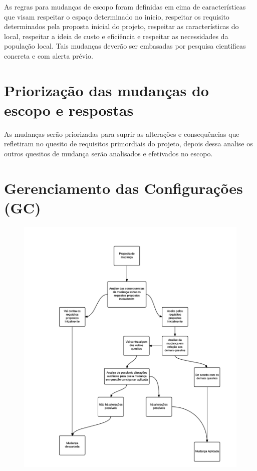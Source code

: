 As regras para mudanças de escopo foram definidas em cima de características que visam respeitar o espaço determinado no inicio, respeitar os requisito determinados pela proposta inicial do projeto, respeitar as características do local, respeitar a ideia de custo e eficiência e respeitar as necessidades da população local. Tais mudanças deverão ser embasadas por pesquisa cientificas concreta e com alerta prévio.

\section*{Priorização das mudanças do escopo e respostas}
As mudanças serão priorizadas para suprir as alterações e consequências que refletiram no quesito de requisitos primordiais do projeto, depois dessa analise os outros quesitos de mudança serão analisados e efetivados no escopo.

\section*{Gerenciamento das Configurações (GC)}
\begin{figure}[!ht]
\centering
\includegraphics[scale=0.5]{editaveis/figuras/configuracoes}
\label{Rotulo}
\end{figure}
\FloatBarrier

